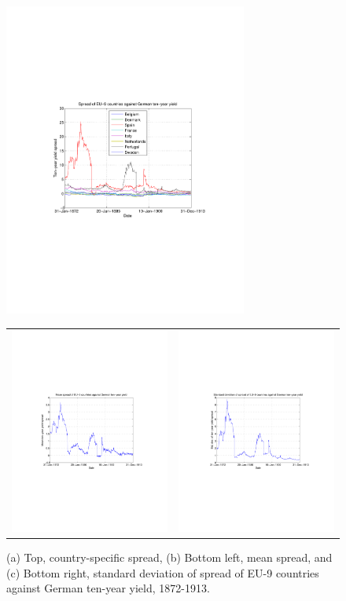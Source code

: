 \documentclass[3p]{elsarticle}
\begin{document}
\begin{figure}[ht!]
	\centering
	\includegraphics[width=8cm]{fig_de_spread_eu9}\\
	\begin{tabular}{cc}
		\includegraphics[width=7cm]{fig_de_meanspread_eu9} & \includegraphics[width=7cm]{fig_de_stdspread_eu9}\\
	\end{tabular}
	\caption{(a) Top, country-specific spread, (b) Bottom left, mean spread, and (c) Bottom right, standard deviation of spread of EU-9 countries against German ten-year yield, 1872-1913.}
	\label{fig:de_spread_eu9}
\end{figure}
\end{document}
